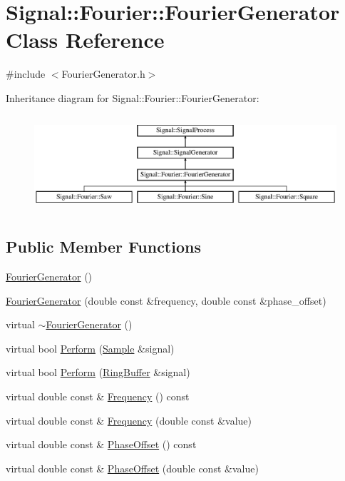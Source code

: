 \hypertarget{classSignal_1_1Fourier_1_1FourierGenerator}{\section{Signal\+:\+:Fourier\+:\+:Fourier\+Generator Class Reference}
\label{classSignal_1_1Fourier_1_1FourierGenerator}
}


{\ttfamily \#include $<$Fourier\+Generator.\+h$>$}

Inheritance diagram for Signal\+:\+:Fourier\+:\+:Fourier\+Generator\+:\begin{figure}[H]
\begin{center}
\leavevmode
\includegraphics[height=3.589744cm]{classSignal_1_1Fourier_1_1FourierGenerator}
\end{center}
\end{figure}
\subsection*{Public Member Functions}
\begin{DoxyCompactItemize}
\item 
\hyperlink{classSignal_1_1Fourier_1_1FourierGenerator_a9679c0c9255c134291ce2d4773ff7040}{Fourier\+Generator} ()
\item 
\hyperlink{classSignal_1_1Fourier_1_1FourierGenerator_a901bed4cdb21981dc1fb08fcdb7d2497}{Fourier\+Generator} (double const \&frequency, double const \&phase\+\_\+offset)
\item 
virtual \hyperlink{classSignal_1_1Fourier_1_1FourierGenerator_a4a6dbc1bdad8087386aac907e7df481d}{$\sim$\+Fourier\+Generator} ()
\item 
virtual bool \hyperlink{classSignal_1_1Fourier_1_1FourierGenerator_a6ec444e7b66d2cb339c001704071646a}{Perform} (\hyperlink{classSignal_1_1Sample}{Sample} \&signal)
\item 
virtual bool \hyperlink{classSignal_1_1Fourier_1_1FourierGenerator_acc6a3825eb4060269749a37ae29ee847}{Perform} (\hyperlink{classSignal_1_1RingBuffer}{Ring\+Buffer} \&signal)
\item 
virtual double const \& \hyperlink{classSignal_1_1SignalGenerator_a96af42ee68f94e9b04d034fd68b73ecd}{Frequency} () const 
\item 
virtual double const \& \hyperlink{classSignal_1_1SignalGenerator_af83b532bf3ddc3637c2fd7a1dfd095cb}{Frequency} (double const \&value)
\item 
virtual double const \& \hyperlink{classSignal_1_1SignalGenerator_ac2538ec946f001e394d2416fda698d1c}{Phase\+Offset} () const 
\item 
virtual double const \& \hyperlink{classSignal_1_1SignalGenerator_ac6a103ff72beaa338f6d18c812522d78}{Phase\+Offset} (double const \&value)
\end{DoxyCompactItemize}
